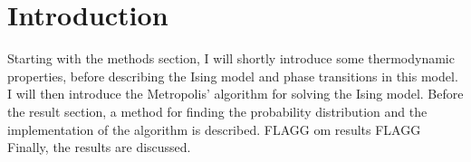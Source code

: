 \section{Introduction}
\label{sec:introduction}
Starting with the methods section, I will shortly introduce some thermodynamic properties, before describing the Ising model and phase transitions in this model. I will then introduce the Metropolis' algorithm for solving the Ising model. Before the result section, a method for finding the probability distribution and the implementation of the algorithm is described. FLAGG om results FLAGG Finally, the results are discussed.    